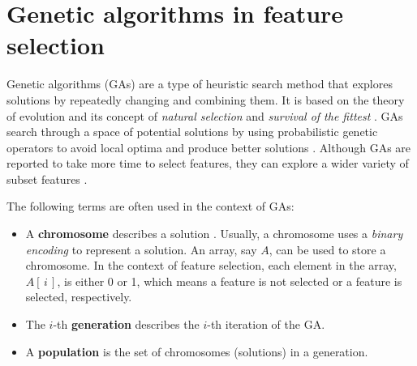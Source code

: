 \documentclass[12pt, twoside, a4paper]{report}
\begin{document}
\section{Genetic algorithms in feature selection} \label{bg:fs:ga}

Genetic algorithms (GAs) are a type of heuristic search method that explores solutions by repeatedly changing and combining them. It is based on the theory of evolution and its concept of \textit{natural selection} and \textit{survival of the fittest} \cite{RefWorks:205}. GAs search through a space of potential solutions by using probabilistic genetic operators to avoid local optima and produce better solutions \cite{RefWorks:210, RefWorks:207, RefWorks:211}. Although GAs are reported to take more time to select features, they can explore a wider variety of subset features \cite{RefWorks:232}.

The following terms are often used in the context of GAs:
\begin{itemize}
  \item A \textbf{chromosome} describes a solution \cite{RefWorks:205, RefWorks:209}. Usually, a chromosome uses a \textit{binary encoding} to represent a solution. An array, say $A$, can be used to store a chromosome. In the context of feature selection, each element in the array, $A[\,i\,]$, is either 0 or 1, which means a feature is not selected or a feature is selected, respectively.
  
  \item The $i$-th \textbf{generation} describes the $i$-th iteration of the GA.
  
  \item A \textbf{population} is the set of chromosomes (solutions) in a generation.
\end{itemize}
\end{document}
